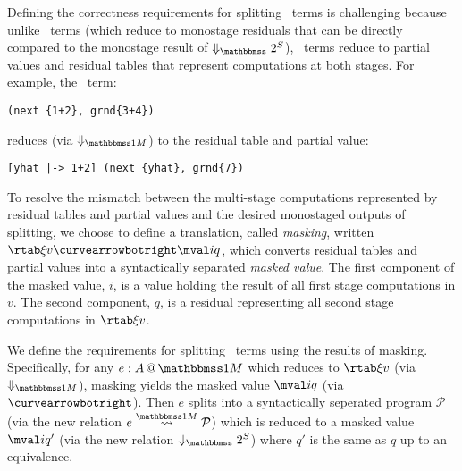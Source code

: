\begin{abstrsyn}
Defining the correctness requirements for splitting \bbonem\ terms is
challenging because unlike \bbtwo\ terms (which reduce to monostage
residuals that can be directly compared to the monostage result of
$\sepredtwosym$), \bbonem\ terms reduce to partial values and residual
tables that represent computations at both stages.
For example, the \bbonem\ term:
\begin{lstlisting}
(next {1+2}, grnd{3+4})
\end{lstlisting}
reduces (via $\redonesym$) to the residual table and partial value:
\begin{lstlisting}
[yhat |-> 1+2] (next {yhat}, grnd{7})
\end{lstlisting}

To resolve the mismatch between the multi-stage computations
represented by residual tables and partial values and the desired monostaged
outputs of splitting,
we choose to define a translation, called {\em masking}, written $\rtab \xi v \vsplito \mval i q$,
which converts residual tables and partial values into a syntactically separated {\em masked value}.
The first component of the masked value, $i$, is a value holding the
result of all first stage computations in $v$.  The second component,
$q$, is a residual representing all second stage computations in $\rtab
\xi v$.



We define the requirements for splitting \bbonem\ terms using the
results of masking. Specifically, for any $\colmix e A$ which reduces
to $\rtab \xi v$ (via $\redonesym$), masking yields the masked value
$\mval i q$ (via $\vsplito$).  Then $e$ splits into a syntactically
seperated program $\mathcal{P}$ (via the new relation $e \splitonesym
\mathcal{P}$) which is reduced to a masked value $\mval i {q'}$ (via
the new relation $\sepredtwosym$) where $q'$ is the same as $q$ up to
an equivalence.


\end{abstrsyn}
